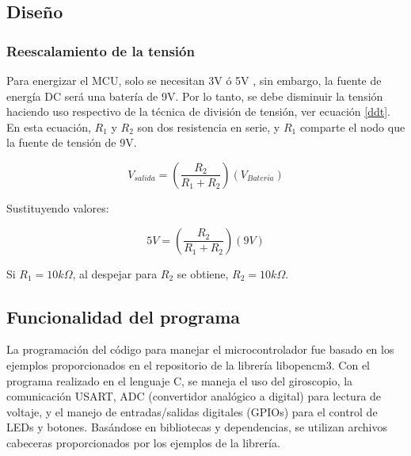 

\subsection{Diseño}

\subsubsection{Reescalamiento de la tensión}

Para energizar el MCU, solo se necesitan 3V ó 5V \cite{STM}, sin embargo, la fuente de energía DC será una batería de 9V. Por lo tanto, se debe disminuir la tensión haciendo uso respectivo de la técnica de división de tensión, ver ecuación \ref{ddt}. En esta ecuación, $R_1$ y $R_2$ son dos resistencia en serie, y $R_1$ comparte el nodo que la fuente de tensión de 9V.

\begin{equation}
    V_{salida}=\left ( \frac{R_{2}}{R_{1} + R_{2}} \right )\left ( V_{Bateria} \right )
    \label{ddt}
\end{equation}

Sustituyendo valores:

\begin{equation*}
    5V = \left ( \frac{R_{2}}{R_{1} + R_{2}} \right )\left ( 9V \right )
    \label{ddt}
\end{equation*}

Si $R_1 = 10k\Omega$, al despejar para $R_2$ se obtiene, $R_2 = 10k \Omega$.



\subsection{Funcionalidad del programa}


La programación del código para manejar el microcontrolador fue basado en los ejemplos proporcionados en el repositorio de la librería libopencm3. Con el programa realizado en el lenguaje C, se maneja el uso del giroscopio, la comunicación USART, ADC (convertidor analógico a digital) para lectura de voltaje, y el manejo de entradas/salidas digitales (GPIOs) para el control de LEDs y botones. Basándose en bibliotecas y dependencias, se utilizan archivos cabeceras proporcionados por los ejemplos de la librería.\\

